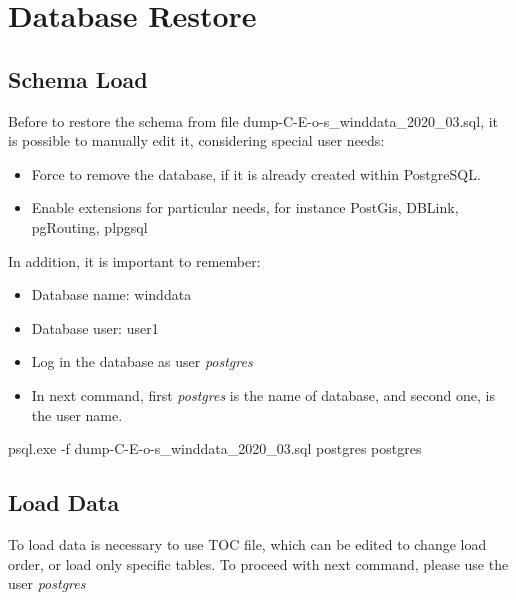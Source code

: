 \documentclass[12pt,oneside]{reedthesis}
\newenvironment{Shaded}{\begin{snugshade}}{\end{snugshade}}
\newcommand{\ExtensionTok}[1]{#1}
\newcommand{\NormalTok}[1]{#1}
\providecommand{\tightlist}{%
  \setlength{\itemsep}{0pt}\setlength{\parskip}{0pt}}
\begin{document}
\hypertarget{database-restore}{%
\section{Database Restore}\label{database-restore}}

\hypertarget{schema-load}{%
\subsection{Schema Load}\label{schema-load}}

Before to restore the schema from file dump-C-E-o-s\_winddata\_2020\_03.sql, it is possible to manually edit it, considering special user needs:
\begin{itemize}
\tightlist
\item
  Force to remove the database, if it is already created within PostgreSQL.
\item
  Enable extensions for particular needs, for instance PostGis, DBLink, pgRouting, plpgsql
\end{itemize}
In addition, it is important to remember:
\begin{itemize}
\tightlist
\item
  Database name: winddata
\item
  Database user: user1
\item
  Log in the database as user \emph{postgres}
\item
  In next command, first \emph{postgres} is the name of database, and second one, is the user name.
\end{itemize}
\scriptsize

\vspace{0.4cm}
\begin{Shaded}
\begin{Highlighting}[]
      \ExtensionTok{psql.exe}\NormalTok{ -f dump-C-E-o-s_winddata_2020_03.sql postgres postgres}
\end{Highlighting}
\end{Shaded}
\normalsize

\hypertarget{load-data}{%
\subsection{Load Data}\label{load-data}}

To load data is necessary to use TOC file, which can be edited to change load order, or load only specific tables. To proceed with next command, please use the user \emph{postgres}
\end{document}
